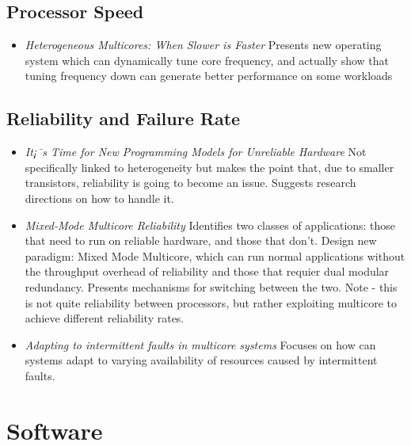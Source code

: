 \subsection{Processor Speed}
\begin{itemize}
\item \emph{Heterogeneous Multicores: When Slower is Faster}
Presents new operating system which can dynamically tune core
frequency, and actually show that tuning frequency down
can generate better performance on some workloads 
\end{itemize}
\subsection{Reliability and Failure Rate}
\begin{itemize}
\item \emph{It¡¯s Time for New Programming Models for Unreliable Hardware }
Not specifically linked to heterogeneity but makes the point that, due
to smaller transistors, reliability is going to become an issue. Suggests
research directions on how to handle it.
\item \emph{Mixed-Mode Multicore Reliability} Identifies two classes
of applications: those that need to run on reliable hardware, and those
 that don't. Design new paradigm: Mixed Mode Multicore, which can
run normal applications without the throughput overhead of reliability
and those that requier dual modular redundancy. Presents mechanisms
for switching between the two. Note - this is not quite
reliability between processors, but rather exploiting multicore
to achieve different reliability rates.
\item \emph{Adapting to intermittent faults in multicore systems}
Focuses on how can systems adapt to varying availability of resources
caused by intermittent faults.
\end{itemize}

\section{Software}

